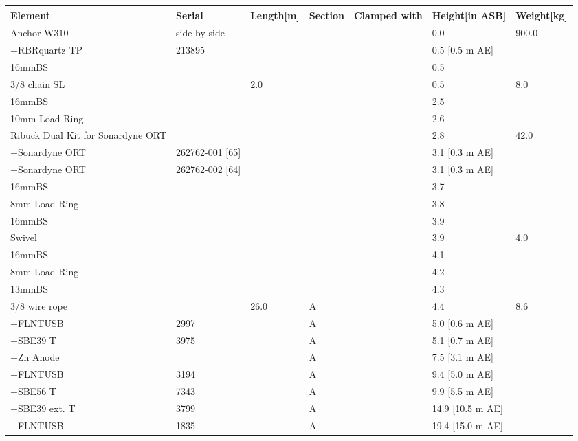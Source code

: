 \documentclass{article}
\begin{document}
\begin{tabularx}{\linewidth}{|X|X|l|l|l|X|l|}
\caption{W310 \textcolor{blue}{$\blacksquare$}: Assembly summary}\\
\hline
\textbf{Element} & \textbf{Serial} & \textbf{Length[m]} & \textbf{Section} & \textbf{Clamped with} & \textbf{Height[in ASB]} & \textbf{Weight[kg]} \\
\hline
Anchor W310 & side-by-side &  &  &  & 0.0 & 900.0 \\ \hline
$-$RBRquartz TP & 213895 &  &  &  & 0.5 [0.5 m AE] &  \\ \hline
16mmBS &  &  &  &  & 0.5 &  \\ \hline
3/8 chain SL &  & 2.0 &  &  & 0.5 & 8.0 \\ \hline
16mmBS &  &  &  &  & 2.5 &  \\ \hline
10mm Load Ring &  &  &  &  & 2.6 &  \\ \hline
Ribuck Dual Kit for Sonardyne ORT &  &  &  &  & 2.8 & 42.0 \\ \hline
$-$Sonardyne ORT & 262762-001 [65] &  &  &  & 3.1 [0.3 m AE] &  \\ \hline
$-$Sonardyne ORT & 262762-002 [64] &  &  &  & 3.1 [0.3 m AE] &  \\ \hline
16mmBS &  &  &  &  & 3.7 &  \\ \hline
8mm Load Ring &  &  &  &  & 3.8 &  \\ \hline
16mmBS &  &  &  &  & 3.9 &  \\ \hline
Swivel &  &  &  &  & 3.9 & 4.0 \\ \hline
16mmBS &  &  &  &  & 4.1 &  \\ \hline
8mm Load Ring &  &  &  &  & 4.2 &  \\ \hline
13mmBS &  &  &  &  & 4.3 &  \\ \hline
3/8 wire rope &  & 26.0 & A &  & 4.4 & 8.6 \\ \hline
$-$FLNTUSB & 2997 &  & A &  & 5.0 [0.6 m AE] &  \\ \hline
$-$SBE39 T & 3975 &  & A &  & 5.1 [0.7 m AE] &  \\ \hline
$-$Zn Anode &  &  & A &  & 7.5 [3.1 m AE] &  \\ \hline
$-$FLNTUSB & 3194 &  & A &  & 9.4 [5.0 m AE] &  \\ \hline
$-$SBE56 T & 7343 &  & A &  & 9.9 [5.5 m AE] &  \\ \hline
$-$SBE39 ext. T & 3799 &  & A &  & 14.9 [10.5 m AE] &  \\ \hline
$-$FLNTUSB & 1835 &  & A &  & 19.4 [15.0 m AE] &  \\ \hline

\end{tabularx}
\end{document}

